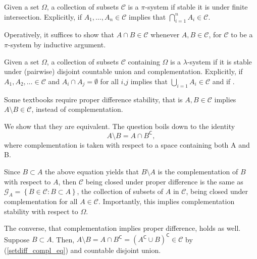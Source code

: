 \begin{my_definition}[$\pi$-system]
	Given a set $\Omega$, a collection of subsets $\mathcal{C}$ is a $\pi$-system if stable it is under finite intersection. Explicitly, if $A_1, \dots, A_n \in \mathcal{C}$ implies that $\bigcap^n_{i=1} A_i \in \mathcal{C}$.
\end{my_definition}
\begin{my_remark}
	Operatively, it suffices to show that $A \cap B \in \mathcal{C}$ whenever $A,B \in \mathcal{C}$, for $\mathcal{C}$ to be a $\pi$-system by inductive argument.
\end{my_remark}
\begin{my_definition}
	Given a set $\Omega$, a collection of subsets $\mathcal{C}$ containing $\Omega$ is a $\lambda$-system if it is stable under (pairwise) disjoint countable union and complementation. Explicitly, if $A_1, A_2, \dots \in \mathcal{C}$ and $A_i \cap A_j = \emptyset$ for all $i$,$j$ implies that $\bigcup_{i=1} A_i \in \mathcal{C}$ and if .
\end{my_definition}
\begin{my_remark}
	\label{proper_diff_stab}
	Some textbooks require proper difference stability, that is $A,B \in \mathcal{C}$ implies $A \setminus B \in \mathcal{C}$, instead of complementation.
	
	We show that they are equivalent. The question boils down to the identity
	\begin{equation}
		\label{setdiff_compl_eq}
		A \setminus B = A \cap B^\mathsf{C},		
	\end{equation}
	where complementation is taken with respect to a space containing both A and B. 
	
	Since $B \subset A$ the above equation yields that $B \setminus A$ is the complementation of $B$ with respect to $A$, then $\mathcal{C}$ being closed under proper difference is the same as $\mathcal{G}_A=\left \{B \in \mathcal{C} : B \subset A \right \}$, the collection of subsets of $A$ in $\mathcal{C}$, being closed under complementation for all $A \in \mathcal{C}$.	Importantly, this implies complementation stability with respect to $\Omega$.
	
	The converse, that complementation implies proper difference, holds as well. Suppose $B \subset A$. Then, $A \setminus B = A \cap B^\mathsf{C} = (A^\mathsf{C} \cup B)^\mathsf{C} \in \mathcal{C}$ by (\ref{setdiff_compl_eq}) and countable disjoint union.
\end{my_remark}
